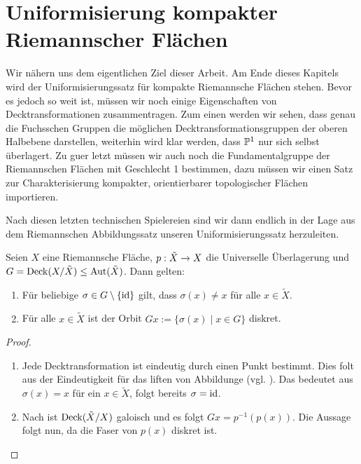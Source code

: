 \section{Uniformisierung kompakter Riemannscher Flächen}
\label{sec:uniformisierung}

Wir nähern uns dem eigentlichen Ziel dieser Arbeit. Am Ende dieses
Kapitels wird der Uniformisierungssatz für kompakte Riemannsche
Flächen stehen. Bevor es jedoch so weit ist, müssen wir noch einige
Eigenschaften von Decktransformationen zusammentragen. Zum einen
werden wir sehen, dass genau die Fuchsschen Gruppen die möglichen
Decktransformationsgruppen der oberen Halbebene darstellen, weiterhin
wird klar werden, dass $\P^1$ nur sich selbst überlagert. Zu guer
letzt müssen wir auch noch die Fundamentalgruppe der Riemannschen
Flächen mit Geschlecht 1 bestimmen, dazu müssen wir einen Satz zur
Charakterisierung kompakter, orientierbarer topologischer Flächen
importieren.

Nach diesen letzten technischen Spielereien sind wir dann endlich in
der Lage aus dem Riemannschen Abbildungssatz unseren
Uniformisierungssatz herzuleiten.

\begin{lemma}
  \label{lemma:decktrafo-diskret}
  Seien $X$ eine Riemannsche Fläche, $p: \tilde X \ra X$ die
  Universelle Überlagerung und $G = \Deck(X /\tilde X) \leq
  \Aut(\tilde X)$. Dann gelten:
  \begin{enumerate}
  \item Für beliebige $\sigma \in G \setminus \{\id\}$ gilt, dass $\sigma
    (x) \neq x $ für alle $x \in \tilde X$.
  \item Für alle $x \in \tilde X$ ist der Orbit $Gx := \{ \sigma(x)
    \mid x \in G\}$ diskret.
  \end{enumerate}
\end{lemma}

\begin{proof}
  \begin{enumerate}
  \item Jede Decktransformation ist eindeutig durch einen Punkt
    bestimmt. Dies folt aus der Eindeutigkeit für das liften von
    Abbildunge (vgl. \cite[Satz 4.8]{For}). Das bedeutet aus
    $\sigma(x) = x$ für ein $x \in \tilde X$, folgt
    bereits $\sigma = \id$.
  \item Nach \cite[Satz 5.6]{For} ist $\Deck(\tilde X/X)$ galoisch und
    es folgt $Gx = p^{-1}(p(x))$. Die Aussage folgt nun, da die Faser
    von $p(x)$ diskret ist.
  \end{enumerate}
\end{proof}

